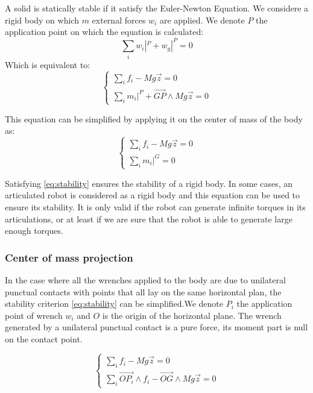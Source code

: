 A solid is statically stable if it satisfy the Euler-Newton Equation. We considere a rigid body on which $m$ external forces $w_i$ are applied. We denote $P$ the application point on which the equation is calculated:
\begin{equation}
  \sum\limits_i w_i|^P + w_g|^P = 0
\end{equation}
Which is equivalent to:
\begin{equation}
\left\{
\begin{array}{r}
  \sum\limits_i f_i - Mg\vec{z} = 0 \\
  \sum\limits_i m_i|^P + \overrightarrow{GP}\wedge Mg\vec{z} = 0
\end{array}
\right.
\end{equation}

This equation can be simplified by applying it on the center of mass of the body as:
\begin{equation}
\left\{
\begin{array}{r}
  \sum\limits_i f_i - Mg\vec{z} = 0 \\
  \sum\limits_i m_i|^G = 0
\end{array}
\right.
\label{eq:stability}
\end{equation}

Satisfying \ref{eq:stability} ensures the stability of a rigid body.
In some cases, an articulated robot is considered as a rigid body and this equation can be used to ensure its stability.
It is only valid if the robot can generate infinite torques in its articulations, or at least if we are sure that the robot is able to generate large enough torques.

\subsubsection{Center of mass projection}
\label{subsub:center_of_mass_projection}

In the case where all the wrenches applied to the body are due to unilateral punctual contacts with points that all lay on the same horizontal plan, the stability criterion \ref{eq:stability} can be simplified.We denote $P_i$ the application point of wrench $w_i$ and $O$ is the origin of the horizontal plane.
The wrench generated by a unilateral punctual contact is a pure force, its moment part is null on the contact point.

\begin{equation}
\left\{
\begin{array}{r}
  \sum\limits_i f_i - Mg\vec{z} = 0 \\
  \sum\limits_i \overrightarrow{OP_i}\wedge f_i - \overrightarrow{OG} \wedge Mg\vec{z} = 0
\end{array}
\right.
\end{equation}

